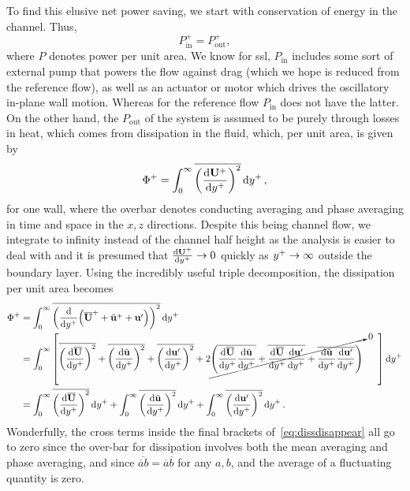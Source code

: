 To find this elusive net power saving, we start with conservation of energy in the channel. Thus,
\begin{equation}
	P_\text{in}^{+}=P_\text{out}^{+}
,\end{equation}
where $P$ denotes power per unit area. We know for \gls*{ssl}, $P_\text{in} $ includes some sort of external pump that powers the flow against drag (which we hope is reduced from the reference flow), as well as an actuator or motor which drives the oscillatory in-plane wall motion. Whereas for the reference flow $P_\text{in} $ does not have the latter. On the other hand, the $P_\text{out} $ of the system is assumed to be purely through losses in heat, which comes from dissipation in the fluid, which, per unit area, is given by
\begin{equation}
	\Phi ^{+}=\int_{0}^{\infty} \overline{\left( \dv{\mathbf{U} \ensuremath{^{+}}}{y\ensuremath{^{+}}}  \right) ^2}  \dd{y\ensuremath{^{+}}} 
,\end{equation}
for one wall, where the overbar denotes conducting averaging and phase averaging in time and space in the $x,z$ directions. Despite this being channel flow, we integrate to infinity instead of the channel half height as the analysis is easier to deal with and it is presumed that $\dv{\mathbf{U}\ensuremath{^{+}}}{y\ensuremath{^{+}}} \to0$ quickly as $y^{+}\to\infty$ outside the boundary layer. Using the incredibly useful triple decomposition, the dissipation per unit area becomes
\begin{align}
	\Phi ^{+}&=\int_{0}^{\infty} \overline{\left( \dv{y\ensuremath{^{+}}}(\overline{\mathbf{U}} ^{+} + \tilde{\mathbf{u} }^{+} + \mathbf{u'} )  \right) ^2}  \dd{y\ensuremath{^{+}}}\\ 
		 &=\int_{0}^{\infty} \left[ \overline{\left( \dv{\overline{\mathbf{U} }}{y\ensuremath{^{+}}}  \right) ^2}+\overline{\left( \dv{\tilde{\mathbf{u} }}{y\ensuremath{^{+}}}  \right) ^2} + \overline{\left(\dv{\mathbf{u'} }{y\ensuremath{^{+}}}\right) ^2} + 2\cancelto{0}{\left( \overline{\dv{ \overline{\mathbf{U} }}{y\ensuremath{^{+}}}\dv{ \tilde{\mathbf{u} }}{y\ensuremath{^{+}}} } + \overline{\dv{ \overline{\mathbf{U} }}{y\ensuremath{^{+}}}\dv{\mathbf{u'} }{y\ensuremath{^{+}}} } + \overline{\dv{ \tilde{\mathbf{u} }}{y\ensuremath{^{+}}}\dv{\mathbf{u'}}{y\ensuremath{^{+}}} } \right)}\phantom{--} \right] \dd{y\ensuremath{^{+}}} \label{eq:dissdisappear}  \\
		 &=\int_{0}^{\infty}  \overline{\left( \dv{\overline{\mathbf{U} }}{y\ensuremath{^{+}}}  \right) ^2}\dd{y\ensuremath{^{+}}}+\int_{0}^{\infty}  \overline{\left( \dv{\tilde{\mathbf{u} }}{y\ensuremath{^{+}}}  \right) ^2} \dd{y\ensuremath{^{+}}} + \int_{0}^{\infty}  \overline{\left(\dv{\mathbf{u'} }{y\ensuremath{^{+}}}\right) ^2} \dd{y\ensuremath{^{+}}}
.\end{align}
Wonderfully, the cross terms inside the final brackets of~\ref{eq:dissdisappear} all go to zero since the over-bar for dissipation involves both the mean averaging and phase averaging, and since $\overline{\overline{a}b}=\overline{a}\overline{b}$ for any $a,b$, and the average of a fluctuating quantity is zero.
